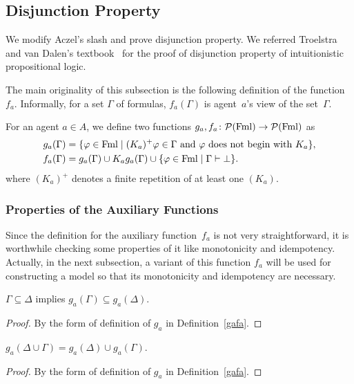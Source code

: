 \subsection{Disjunction Property}

We modify Aczel's slash and prove disjunction property.
We referred Troelstra and van Dalen's textbook~\cite[3.5]{troelstra1988constructivism}
for the proof of disjunction property of intuitionistic propositional logic.

The main originality of this subsection is the following definition of the function $f_a$.
Informally, for a set $\Gamma$ of formulas,  $f_a(\Gamma)$ is agent~$a$'s view of the
set~$\Gamma$.
\begin{definition}
 \label{gafa}
 For an agent $a\in A$, we define 
 two functions $g_a, f_a\colon {\mathcal P({\operatorname{Fml}})}\rightarrow {\mathcal P({\operatorname{Fml}})}$ as
\begin{align*}
 g_a(\Gamma)&=\{\varphi\in\operatorname{Fml}\mid (K_a)^+\varphi\in\Gamma\text{ and }\varphi\text{ does
 not begin with }K_a\},\\
 f_a({\Gamma}) &= g_a(\Gamma) \cup K_ag_a(\Gamma) \cup \{\varphi\in\operatorname{Fml}\mid \Gamma\vdash\bot\}.
\end{align*}
 where $(K_a)^+$ denotes a finite repetition of at least one $(K_a)$.
\end{definition}

\subsubsection{Properties of the Auxiliary Functions}

Since the definition for the auxiliary function~$f_a$ is not very straightforward,
it is worthwhile checking some properties of it like monotonicity and idempotency.
Actually, in the next subsection, a variant of this function $f_a$ will be used for
constructing a model so that its monotonicity and idempotency are necessary.

\begin{proposition}
 \label{g_mono}
 $\Gamma\subseteq \Delta$ implies $g_a(\Gamma)\subseteq g_a(\Delta)$.
\end{proposition}
\begin{proof}
 By the form of definition of $g_a$ in Definition~\ref{gafa}.
\end{proof}

\begin{proposition}
 \label{cupg}
 $g_a(\Delta\cup \Gamma) = g_a(\Delta)\cup g_a(\Gamma)$.
\end{proposition}
\begin{proof}
 By the form of definition of $g_a$ in Definition~\ref{gafa}.
\end{proof}

